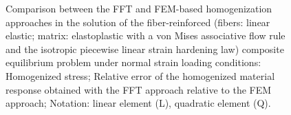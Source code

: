 \begin{figure}[hbt]
\begin{subfigure}[b]{0.49\textwidth}
      \caption{}
      \label{subfig:von_mises_res_mat_small_strain_2D_shear_material_response_error}
    \end{subfigure}
  \caption{Comparison between the FFT and FEM-based homogenization approaches in the solution
  of the fiber-reinforced (fibers: linear elastic; matrix: elastoplastic with a von Mises associative flow rule and the isotropic piecewise linear strain hardening law) composite equilibrium problem under normal strain
  loading conditions:  Homogenized
  stress;  Relative error of the homogenized material response obtained with the FFT approach relative to the FEM approach;
  Notation: linear element (L), quadratic element (Q).}
\label{fig:von_mises_res_mat_small_strain_2D_shear_material_response_and_error}
\end{figure}

